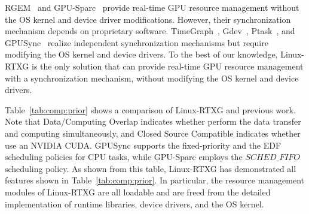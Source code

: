 \label{sec:relatedwork}
\begin{table*}[t]
\begin{center}
\caption{Linux-RTXG vs Prior Work}
\label{tab:comp:prior}
\ifthesis
{}
\fi
\end{center}
\vspace{-4mm}
\end{table*}

RGEM~\cite{kato:rgem} and GPU-Sparc~\cite{sparc} provide real-time GPU resource management without the OS kernel and device driver modifications.
However, their synchronization mechanism depends on proprietary software.
TimeGraph~\cite{kato:timegraph}, Gdev~\cite{kato:gdev}, Ptask~\cite{ptask}, and GPUSync~\cite{elliott:gpusync13} realize independent synchronization mechanisms but require modifying the OS kernel and device drivers.
To the best of our knowledge, Linux-RTXG is the only solution that can provide real-time GPU resource management with a synchronization mechanism, without modifying the OS kernel and device drivers.

Table~\ref{tab:comp:prior} shows a comparison of Linux-RTXG and previous work.
Note that Data/Computing Overlap indicates whether perform the data transfer and computing simultaneously, and Closed Source Compatible indicates whether use an NVIDIA  CUDA.
GPUSync supports the fixed-priority and the EDF scheduling policies for CPU tasks, while GPU-Sparc employs the $SCHED\_FIFO$ scheduling policy.
As shown from this table, Linux-RTXG has demonstrated all features shown in Table~\ref{tab:comp:prior}.
In particular, the resource management modules of Linux-RTXG are all loadable and are freed from the detailed implementation of runtime libraries, device drivers, and the OS kernel.

